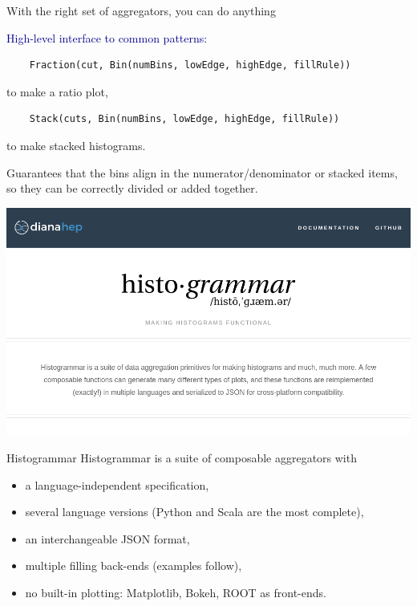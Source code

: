 \documentclass[aspectratio=169]{beamer}
\begin{document}
\begin{frame}[fragile]{With the right set of aggregators, you can do anything}
\begin{center}
\begin{minipage}{0.9\linewidth}
\small
\textcolor{darkblue}{\normalsize High-level interface to common patterns:}
\begin{verbatim}
    Fraction(cut, Bin(numBins, lowEdge, highEdge, fillRule))
\end{verbatim}

{\normalsize to make a ratio plot,}

\begin{verbatim}
    Stack(cuts, Bin(numBins, lowEdge, highEdge, fillRule))
\end{verbatim}

{\normalsize to make stacked histograms.}

\vspace{0.75 cm}
{\normalsize Guarantees that the bins align in the numerator/denominator or stacked items, so they can be correctly divided or added together.}
\end{minipage}
\end{center}
\end{frame}

\begin{frame}{}
\hspace{-1 cm}\mbox{\includegraphics[width=16 cm]{frontpage.png}\hspace{-5 cm}}
\end{frame}

\begin{frame}{Histogrammar}
\large Histogrammar is a suite of composable aggregators with

\vspace{0.3 cm}
\begin{itemize}\setlength{\itemsep}{0.3 cm}
\item<2-> a language-independent specification,
\item<3-> several language versions (Python and Scala are the most complete),
\item<4-> an interchangeable JSON format,
\item<5-> multiple filling back-ends (examples follow),
\item<6-> no built-in plotting: Matplotlib, Bokeh, ROOT as front-ends.
\end{itemize}
\end{frame}
\end{document}
